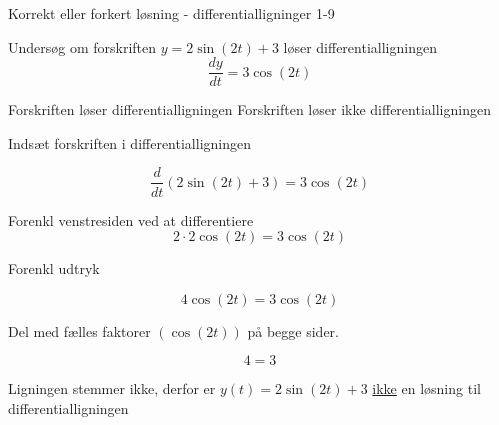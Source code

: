 \documentclass{article}
\begin{document}
\begin{exercise}{Korrekt eller forkert løsning - differentialligninger 1-9}
	
	
	Undersøg om forskriften $y = 2 \sin(2t) + 3$ løser differentialligningen
	\[
	\frac{dy}{dt} = 3 \cos(2t)
	\]
	
\begin{multichoice}
	\itemfalse Forskriften løser differentialligningen 
	\itemtrue Forskriften løser ikke differentialligningen 
\end{multichoice}
	
	\hint
	
	Indsæt forskriften i differentialligningen
	
	\hint
	\[
	\frac{d}{dt} \left(2 \sin(2t) + 3\right) = 3 \cos(2t)
	\]
	
	
	\hint
	
	Forenkl venstresiden ved at differentiere
	\[
	2 \cdot 2 \cos(2t) = 3 \cos(2t)
	\]
	
	\hint
	
	Forenkl udtryk
	
	\hint
	\[
	4 \cos(2t) = 3 \cos(2t)
	\]
	
	\hint
	Del med fælles faktorer $\left(\cos(2t) \right)$ på begge sider.
	
	\hint
	
	\[
	4 = 3
	\]
	
	
	\hint
	
	Ligningen stemmer ikke, derfor er $y(t) = 2 \sin(2t) + 3$ \underline{ikke} en løsning til differentialligningen
	
\end{exercise}

\newpage
\end{document}
